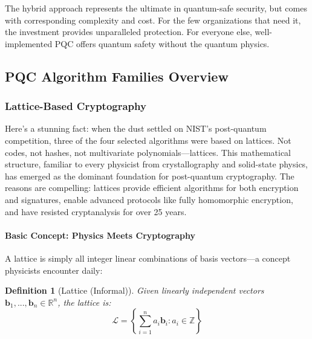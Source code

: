 \documentclass[11pt,a4paper]{article}
\newtheorem{definition}{Definition}
\begin{document}
The hybrid approach represents the ultimate in quantum-safe security, but comes with corresponding complexity and cost. For the few organizations that need it, the investment provides unparalleled protection. For everyone else, well-implemented PQC offers quantum safety without the quantum physics.

\subsection{PQC Algorithm Families Overview}
\label{sec:pqc-families}

\subsubsection{Lattice-Based Cryptography}

Here's a stunning fact: when the dust settled on NIST's post-quantum competition, three of the four selected algorithms were based on lattices. Not codes, not hashes, not multivariate polynomials—lattices. This mathematical structure, familiar to every physicist from crystallography and solid-state physics, has emerged as the dominant foundation for post-quantum cryptography. The reasons are compelling: lattices provide efficient algorithms for both encryption and signatures, enable advanced protocols like fully homomorphic encryption, and have resisted cryptanalysis for over 25 years.

\paragraph{Basic Concept: Physics Meets Cryptography}

A lattice is simply all integer linear combinations of basis vectors—a concept physicists encounter daily:

\begin{definition}[Lattice (Informal)]
Given linearly independent vectors $\mathbf{b}_1, ..., \mathbf{b}_n \in \mathbb{R}^n$, the lattice is:
$$\mathcal{L} = \left\{ \sum_{i=1}^n a_i \mathbf{b}_i : a_i \in \mathbb{Z} \right\}$$
\end{definition}
\end{document}
